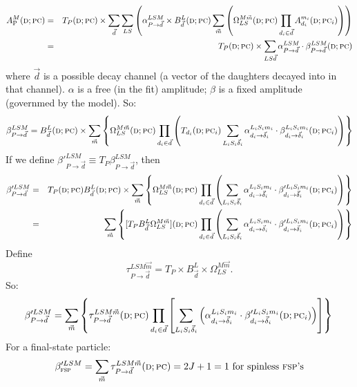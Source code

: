 \documentclass[a4paper]{article}
\newcommand{\parComb}{\ensuremath{\textsc{pc}}}
\newcommand{\dataPt}{\ensuremath{\textsc{d}}}
\newcommand{\fsp}{\ensuremath{\textsc{fsp}}}
\newcommand{\DPC}{\ensuremath{(\dataPt; \parComb)}}
\newcommand{\DPCi}{\ensuremath{(\dataPt; \parComb_i)}}
\newcommand{\amplitude}[2]{\ensuremath{A_{#1}^{#2}\DPC}}
\newcommand{\amplitudei}[2]{\ensuremath{A_{{#1}_i}^{{#2}_i}\DPCi}}
\begin{document}
\begin{eqnarray}
\amplitude{\textrm{P}}{M} &=& T_P\DPC \times \sum_{\vec{d}} \sum_{LS}\left(\alpha^{LSM}_{P\to\vec{d}}\times B^{L}_{\vec{d}}\DPC\sum_{\vec{m}}\left(\Omega_{LS}^{M\vec{m}}\DPC \prod_{d_i\in\vec{d}} \amplitudei{d}{m} \right)\right) \\
%
&=& T_P\DPC \times \sum_{LS\vec{d}} \alpha^{LSM}_{P\to\vec{d}}\cdot\beta^{LSM}_{P\to\vec{d}}\DPC
\end{eqnarray}
where $\vec{d}$ is a possible decay channel (a vector of the daughters
decayed into in that channel). $\alpha$ is a free (in the fit)
amplitude; $\beta$ is a fixed amplitude (governmed by the model). So:
\begin{equation}
  \beta^{LSM}_{P\to\vec{d}} = B^{L}_{\vec{d}}\DPC \times \sum_{\vec{m}} \left\{ \Omega^{M\vec{m}}_{LS}\DPC \prod_{d_i\in\vec{d}} \left(T_{d_i}\DPCi\sum_{L_iS_i\vec{\delta}_i} \alpha^{L_iS_im_i}_{d_i\to\vec{\delta}_i}\cdot\beta^{L_iS_im_i}_{d_i\to\vec{\delta}_i}\DPCi  \right)\right\}
\end{equation}
If we define $\beta'^{LSM}_{P\to\vec{d}} \equiv T_P\beta^{LSM}_{P\to\vec{d}}$, then
\begin{eqnarray}
  \beta'^{LSM}_{P\to\vec{d}} &=& T_P\DPC B^{L}_{\vec{d}}\DPC \times \sum_{\vec{m}} \left\{ \Omega^{M\vec{m}}_{LS}\DPC \prod_{d_i\in\vec{d}} \left(\sum_{L_iS_i\vec{\delta}_i} \alpha^{L_iS_im_i}_{d_i\to\vec{\delta}_i}\cdot\beta'^{L_iS_im_i}_{d_i\to\vec{\delta}_i}\DPCi  \right)\right\}\\
  &=& \sum_{\vec{m}} \left\{ [T_PB^{L}_{\vec{d}}\Omega^{M\vec{m}}_{LS}]\DPC \prod_{d_i\in\vec{d}} \left(\sum_{L_iS_i\vec{\delta}_i} \alpha^{L_iS_im_i}_{d_i\to\vec{\delta}_i}\cdot\beta'^{L_iS_im_i}_{d_i\to\vec{\delta}_i}\DPCi  \right)\right\}\\ 
\end{eqnarray}
Define
\begin{equation}
  \tau_{P\to\vec{d}}^{LSM\vec{m}} = T_P \times B^{L}_{\vec{d}} \times \Omega^{M\vec{m}}_{LS}.
\end{equation}
So:
\begin{equation}
  \beta'^{LSM}_{P\to\vec{d}} =  \sum_{\vec{m}} \left\{ \tau_{P\to\vec{d}}^{LSM\vec{m}}\DPC \prod_{d_i\in\vec{d}} \left[\sum_{L_iS_i\vec{\delta}_i}\left( \alpha^{L_iS_im_i}_{d_i\to\vec{\delta}_i}\cdot\beta'^{L_iS_im_i}_{d_i\to\vec{\delta}_i}\DPCi  \right)\right]\right\}\\ 
\end{equation}
For a final-state particle:
\begin{equation}
\beta'^{LSM}_{\fsp} =  \sum_{\vec{m}} \tau_{P\to\vec{d}}^{LSM\vec{m}}\DPC = 2J + 1 = 1 \textrm{ for spinless \fsp's}
\end{equation}
\end{document}
